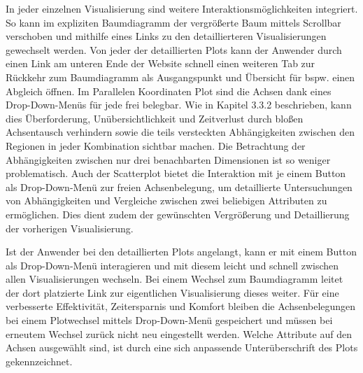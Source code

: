 \documentclass[usegeometry=true]{scrartcl}
\begin{document}
In jeder einzelnen Visualisierung sind weitere Interaktionsmöglichkeiten integriert. 
So kann im expliziten Baumdiagramm der vergrößerte Baum mittels Scrollbar verschoben und mithilfe eines Links zu den detaillierteren Visualisierungen gewechselt werden.
Von jeder der detaillierten Plots kann der Anwender durch einen Link am unteren Ende der Website schnell einen weiteren Tab zur Rückkehr zum Baumdiagramm als Ausgangspunkt und Übersicht für bspw. einen Abgleich öffnen.
Im Parallelen Koordinaten Plot sind die Achsen dank eines Drop-Down-Menüs für jede frei belegbar. 
Wie in Kapitel 3.3.2 beschrieben, kann dies Überforderung, Unübersichtlichkeit und Zeitverlust durch bloßen Achsentausch verhindern 
sowie die teils versteckten Abhängigkeiten zwischen den Regionen in jeder Kombination sichtbar machen. 
Die Betrachtung der Abhängigkeiten zwischen nur drei benachbarten Dimensionen ist so weniger problematisch.
Auch der Scatterplot bietet die Interaktion mit je einem Button als Drop-Down-Menü zur freien Achsenbelegung, 
um detaillierte Untersuchungen von Abhängigkeiten und Vergleiche zwischen zwei beliebigen Attributen zu ermöglichen.
Dies dient zudem der gewünschten Vergrößerung und Detaillierung der vorherigen Visualisierung.

Ist der Anwender bei den detaillierten Plots angelangt, kann er mit einem Button als Drop-Down-Menü interagieren 
und mit diesem leicht und schnell zwischen allen Visualisierungen wechseln.
Bei einem Wechsel zum Baumdiagramm leitet der dort platzierte Link zur eigentlichen Visualisierung dieses weiter. 
Für eine verbesserte Effektivität, Zeitersparnis und Komfort bleiben die Achsenbelegungen bei einem Plotwechsel mittels Drop-Down-Menü gespeichert 
und müssen bei erneutem Wechsel zurück nicht neu eingestellt werden. 
Welche Attribute auf den Achsen ausgewählt sind, ist durch eine sich anpassende Unterüberschrift des Plots gekennzeichnet. 
\end{document}
